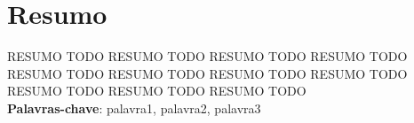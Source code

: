 \chapter*{Resumo}

RESUMO TODO
RESUMO TODO
RESUMO TODO
RESUMO TODO
RESUMO TODO
RESUMO TODO
RESUMO TODO
RESUMO TODO
RESUMO TODO
RESUMO TODO
RESUMO TODO
\\

\noindent \textbf{Palavras-chave}: palavra1, palavra2, palavra3
